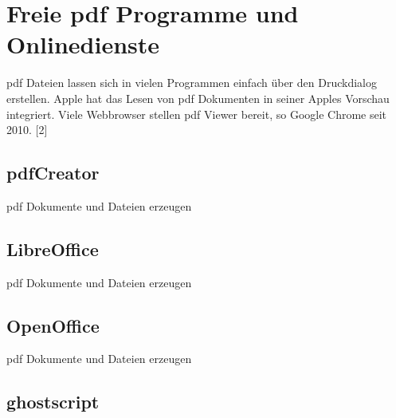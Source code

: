 \section{Freie \gls{pdf} Programme und Onlinedienste}
\gls{pdf} Dateien lassen sich in vielen Programmen einfach über den Druckdialog erstellen. Apple hat das Lesen von \gls{pdf} Dokumenten in seiner Apples Vorschau integriert. Viele Webbrowser stellen \gls{pdf} Viewer bereit, so Google Chrome seit 2010. [2]

\subsection{\gls{pdf}Creator}
\gls{pdf} Dokumente und Dateien erzeugen

\subsection{LibreOffice}
\gls{pdf} Dokumente und Dateien erzeugen

\subsection{OpenOffice}
\gls{pdf} Dokumente und Dateien erzeugen

\subsection{ghostscript}

